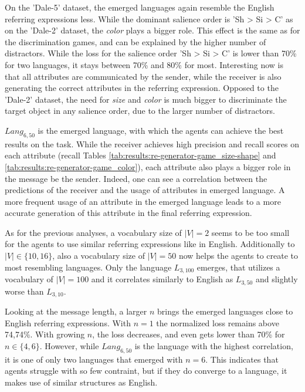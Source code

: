 On the 'Dale-5' dataset, the emerged languages again resemble the English referring expressions less.
While the dominant salience order is 'Sh > Si > C' as on the 'Dale-2' dataset, the \emph{color} plays a bigger role.
This effect is the same as for the discrimination games, and can be explained by the higher number of distractors.
While the loss for the salience order 'Sh > Si > C' is lower than 70\% for two languages, it stays between 70\% and 80\% for most.
Interesting now is that all attributes are communicated by the sender, while the receiver is also generating the correct attributes in the referring expression.
Opposed to the 'Dale-2' dataset, the need for \emph{size} and \emph{color} is much bigger to discriminate the target object in any salience order, due to the larger number of distractors.

$Lang_{6,50}$ is the emerged language, with which the agents can achieve the best results on the task.
While the receiver achieves high precision and recall scores on each attribute (recall Tables \ref{tab:results:re-generator-game_size-shape} and \ref{tab:results:re-generator-game_color}), each attribute also plays a bigger role in the message be the sender.
Indeed, one can see a correlation between the predictions of the receiver and the usage of attributes in emerged language.
A more frequent usage of an attribute in the emerged language leads to a more accurate generation of this attribute in the final referring expression.

As for the previous analyses, a vocabulary size of $|V|=2$ seems to be too small for the agents to use similar referring expressions like in English.
Additionally to $|V| \in \{10,16\}$, also a vocabulary size of $|V|=50$ now helps the agents to create to most resembling languages.
Only the language $L_{3,100}$ emerges, that utilizes a vocabulary of $|V|=100$ and it correlates similarly to English as $L_{3,50}$ and slightly worse than $L_{3,10}$.

Looking at the message length, a larger $n$ brings the emerged languages close to English referring expressions.
With $n=1$ the normalized loss remains above 74,74\%.
With growing $n$, the loss decreases, and even gets lower than 70\% for $n \in \{4,6\}$.
However, while $Lang_{6,50}$ is the language with the highest correlation, it is one of only two languages that emerged with $n=6$.
This indicates that agents struggle with so few contraint, but if they do converge to a language, it makes use of similar structures as English.

